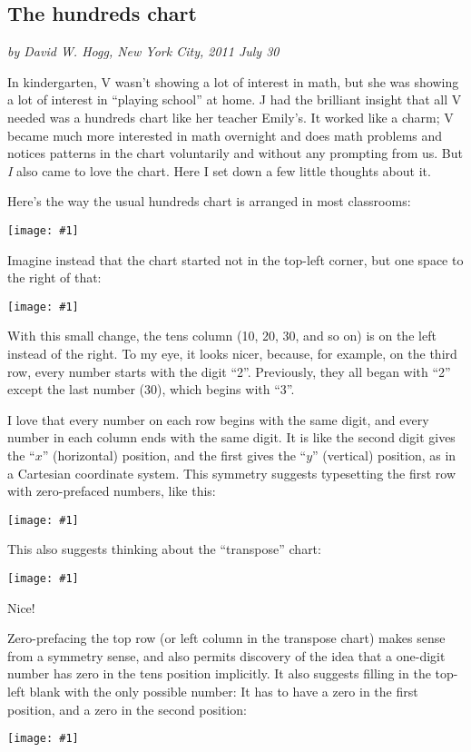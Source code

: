 \documentclass[12pt,pdftex]{article}
\newcommand{\showchart}[1]{\texttt{[image: \#1]}}
\begin{document}
\subsection*{The hundreds chart}

\noindent
\textsl{by David W. Hogg, New York City, 2011 July 30}
\vspace{1ex}

In kindergarten, V wasn't showing a lot of interest in math, but she
was showing a lot of interest in ``playing school'' at home.  J had
the brilliant insight that all V needed was a hundreds chart like her
teacher Emily's.  It worked like a charm; V became much more
interested in math overnight and does math problems and notices
patterns in the chart voluntarily and without any prompting from us.
But \emph{I} also came to love the chart.  Here I set down a few
little thoughts about it.

Here's the way the usual hundreds chart is arranged in most
classrooms:
\begin{center}
\showchart{hundreds_chart_standard.pdf}
\end{center}

Imagine instead that the chart started not in the top-left corner,
but one space to the right of that:
\begin{center}
\showchart{hundreds_chart_skipzero_nzp.pdf}
\end{center}
With this small change, the tens column (10, 20, 30, and so on) is on
the left instead of the right.  To my eye, it looks nicer, because,
for example, on the third row, every number starts with the digit
``2''.  Previously, they all began with ``2'' except the last number
(30), which begins with ``3''.

I love that every number on each row begins with the same digit, and
every number in each column ends with the same digit.  It is like the
second digit gives the ``$x$'' (horizontal) position, and the first
gives the ``$y$'' (vertical) position, as in a Cartesian coordinate
system.  This symmetry suggests typesetting the first row with
zero-prefaced numbers, like this:
\begin{center}
\showchart{hundreds_chart_skipzero.pdf}
\end{center}
This also suggests thinking about the ``transpose'' chart:
\begin{center}
\showchart{hundreds_chart_transpose_skipzero.pdf}
\end{center}
Nice!

Zero-prefacing the top row (or left column in the transpose chart)
makes sense from a symmetry sense, and also permits discovery of the
idea that a one-digit number has zero in the tens position implicitly.
It also suggests filling in the top-left blank with the only possible
number: It has to have a zero in the first position, and a zero in the
second position:
\begin{center}
\showchart{hundreds_chart_default.pdf}
\end{center}
\end{document}
